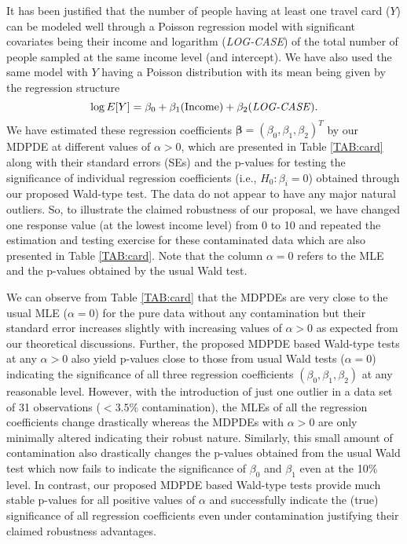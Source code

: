 \documentclass[a4paper]{article}%
\begin{document}
It has been justified that the number of people having at least one travel card ($Y$) can be modeled well through 
a Poisson regression model with significant covariates being their income and 
logarithm (\textit{LOG-CASE}) of the total number of people sampled at the same income level (and intercept).
We have also used the same model with $Y$ having a Poisson distribution with its mean being given by the regression structure
$$
\log E[Y] = \beta_0 + \beta_1 (\mbox{Income}) + \beta_2 (\mbox{\textit{LOG-CASE}}). 
$$
We have estimated these regression coefficients $\boldsymbol{\beta}=(\beta_0, \beta_1, \beta_2)^T$
by our MDPDE at different values of $\alpha>0$, which are presented in Table \ref{TAB:card} along with their standard errors (SEs) and 
the p-values  for testing the significance of individual regression coefficients (i.e., $H_0 : \beta_i = 0$)
obtained through our proposed Wald-type test.
The data do not appear to have any major natural outliers. 
So, to illustrate the claimed robustness of our proposal, we have changed one response value (at the lowest income level) 
from 0 to 10 and repeated the estimation and testing exercise for these contaminated data which are also presented in Table \ref{TAB:card}. 
Note that the column $\alpha=0$ refers to the MLE and the p-values obtained by the usual Wald test.


We can observe from Table \ref{TAB:card} that the MDPDEs are very close to the usual MLE ($\alpha=0$) for the pure data without any contamination
but their standard error increases slightly with increasing values of $\alpha>0$ as expected from our theoretical discussions.
Further, the proposed MDPDE based Wald-type tests at any $\alpha>0$ also yield p-values close to those from usual Wald tests ($\alpha=0$)
indicating the significance of all three regression coefficients $(\beta_0, \beta_1, \beta_2)$ at any reasonable level.
However, with the introduction of just one outlier in a data set of 31 observations ($< 3.5\%$ contamination), 
the MLEs of all the regression coefficients change drastically 
whereas the MDPDEs with $\alpha>0$ are only minimally altered indicating their robust nature. 
Similarly, this small amount of contamination also drastically changes the p-values obtained from the usual Wald test
which now fails to indicate the significance of $\beta_0$ and $\beta_1$ even at the 10\% level.
In contrast, our proposed MDPDE based Wald-type tests  provide much stable p-values for all positive values of $\alpha$ 
and successfully indicate the (true) significance of all regression coefficients even under contamination
justifying their claimed robustness advantages.
\end{document}
